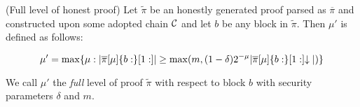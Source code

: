 %
%

\begin{definition}{(Full level of honest proof)}
Let $\tilde\pi$ be an honestly generated proof parsed as $\overline\pi$ and constructed upon some adopted chain $\mathcal{C}$ and let $b$ be any block in
$\tilde\pi$. Then $\mu'$ is defined as follows:

\begin{equation*}
\mu' = \max\{\mu: |\overline\pi[\mu]\{b:\}[1:]| \geq \max(m, (1 - \delta)2^{-\mu}|\overline\pi[\mu]\{b:\}[1:]\negthickspace\downarrow|)\}
\end{equation*}

We call $\mu'$ the \textit{full} level of proof $\tilde\pi$ with respect to
block $b$ with security parameters $\delta$ and $m$.
\end{definition}

